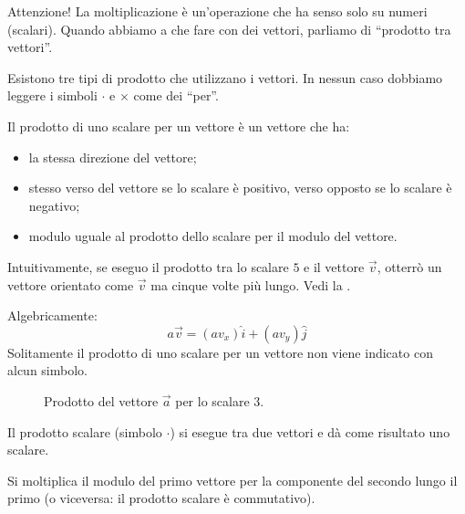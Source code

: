 \documentclass[a4paper,11pt,italian]{article}
\begin{document}
\begin{description}
\begin{soloscientifico}
  \item[Attenzione!]
  La moltiplicazione è un'operazione che ha senso solo su numeri (scalari). Quando abbiamo a che fare con dei vettori, parliamo di ``prodotto tra vettori''. 
  
  Esistono tre tipi di prodotto che utilizzano i vettori. In nessun caso dobbiamo leggere i simboli $ \cdot $ e $ \times $ come dei ``per''.
\end{soloscientifico}

  \item[Prodotto di uno scalare per un vettore]
  Il prodotto di uno scalare per un vettore è un vettore che ha:
  \begin{itemize}
    \item la stessa direzione del vettore;
    \item stesso verso del vettore se lo scalare è positivo, verso opposto se lo scalare è negativo;
    \item modulo uguale al prodotto dello scalare per il modulo del vettore.
  \end{itemize}
  Intuitivamente, se eseguo il prodotto tra lo scalare $ 5 $ e il vettore $ \vec{v} $, otterrò un vettore orientato come $ \vec{v} $ ma cinque volte più lungo. Vedi la .
  
  Algebricamente: 
  \[ a \vec{v} = (a v_x)\hat{i} + (a v_y)\hat{j} \]
  Solitamente il prodotto di uno scalare per un vettore non viene indicato con alcun simbolo.
  
\begin{figure}[htb]\centering
{}\caption{Prodotto del vettore $ \vec{a} $ per lo scalare $ 3 $.}
\label{img:prodottoscalarevettore}
\end{figure}
  
  \item[Prodotto scalare]
  Il prodotto scalare (simbolo $ \cdot $) si esegue tra due vettori e dà come risultato uno scalare.
  
  Si moltiplica il modulo del primo vettore per la componente del secondo lungo il primo (o viceversa: il prodotto scalare è commutativo).
  

\end{description}
\end{document}
